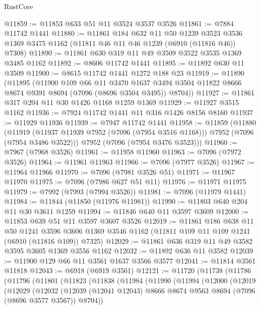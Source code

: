 \begin{lexlean}{RustCore}
\begin{coremodule}
@11859 := @11853 @633 @51 @11 @3524 @3537 @3526
@11861 := @7884 @11742 @1441
@11880 := @11861
    @184
    @632
    @11
    @50
    @1239
    @3523
    @3536
    @1369
    @3475
    @1162
    (@11811 @46 @11 @46 @1239 (@6910 (@11816 @46)) @7308)
@11890 := @11861 @630 @319 @11 @49 @3509 @3522 @3535 @1369 @3485 @1162
@11892 := @8606 @11742 @1441
@11895 := @11892 @630 @11 @3509
@11900 := @8615 @11742 @1441 @1272 @188 @23
@11919 := @11890
    (@11895
      (@11900
        @109
        @66
        @11
        @3470
        @1637
        @3494
        @3504
        @11822
        @8666
        @8674
        @9391
        @8694
        (@7096 (@8696 @3504 @3495))
        @8704))
@11927 := @11861 @317 @204 @11 @30 @1426 @1168 @1259 @1369
@11929 := @11927 @3515 @1162
@11936 := @7924 @11742 @1441 @11 @316 @1426 @8156 @8160
@11937 := @11929 @11936
@11939 := @7947 @11742 @1441
@11958 := @11859
    (@11880
      (@11919 (@11937 @11939 @7952 (@7096 (@7954 @3516 @1168))) @7952 (@7096 (@7954 @3486 @3522)))
      @7952
      (@7096 (@7954 @3476 @3523)))
@11960 := @7967 (@7968 @3526)
@11961 := @11958 @11960
@11963 := @7096 (@7972 @3526)
@11964 := @11961 @11963
@11966 := @7096 (@7977 @3526)
@11967 := @11964 @11966
@11970 := @7096 (@7981 @3526 @51)
@11971 := @11967 @11970
@11975 := @7096 (@7986 @627 @51 @11)
@11976 := @11971 @11975
@11979 := @7992 (@7993 (@7994 @3526))
@11981 := @7096 (@11979 @1441)
@11984 := @11844 (@11850 (@11976 @11981))
@11990 := @11803 @640 @204 @11 @30 @3611 @1259
@11994 := @11846 @640 @11 @3597 @3609
@12000 := @11853 @639 @51 @11 @3597 @3607 @3526
@12019 := @11861
    @186
    @638
    @11
    @50
    @1241
    @3596
    @3606
    @1369
    @3546
    @1162
    (@11811 @109 @11 @109 @1241 (@6910 (@11816 @109)) @7325)
@12029 := @11861 @636 @319 @11 @49 @3582 @3595 @3605 @1369 @3556 @1162
@12032 := @11892 @636 @11 @3582
@12039 := @11900 @129 @66 @11 @3561 @1637 @3566 @3577
@12041 := @11814 @3561 @11818
@12043 := @6918 (@6919 @3561)
@12121 := @11720
    (@11738
      (@11786
        (@11796
          (@11801
            (@11823
              (@11838
                (@11984
                  (@11990
                    (@11994
                      (@12000
                        (@12019
                          (@12029
                            (@12032
                              (@12039
                                (@12041 @12043)
                                @8666
                                @8674
                                @9563
                                @8694
                                (@7096 (@8696 @3577 @3567))
                                @8704))

\end{coremodule}
\end{lexlean}
